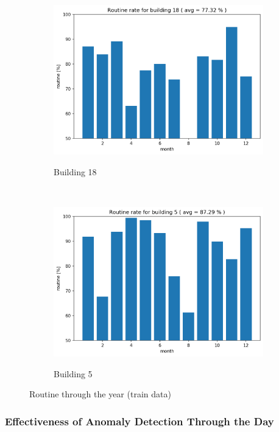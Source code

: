 \begin{figure}[H]
    \begin{subfigure}{.5\textwidth}
		\caption{Building 18}
		\includegraphics[width=1\linewidth]{../Figures/EC/b18year.png}
		\label{fig:ec_b18year}
	\end{subfigure}%
    ~ 
    \begin{subfigure}{.5\textwidth}
		\caption{Building 5}
		\includegraphics[width=1\linewidth]{../Figures/EC/b5year.png}
		\label{fig:ec_b5year}
	\end{subfigure}%
	
	\caption{Routine through the year (train data)}
    \label{fig:ec_year}
\end{figure}

\subsubsection{Effectiveness of Anomaly Detection Through the Day}

